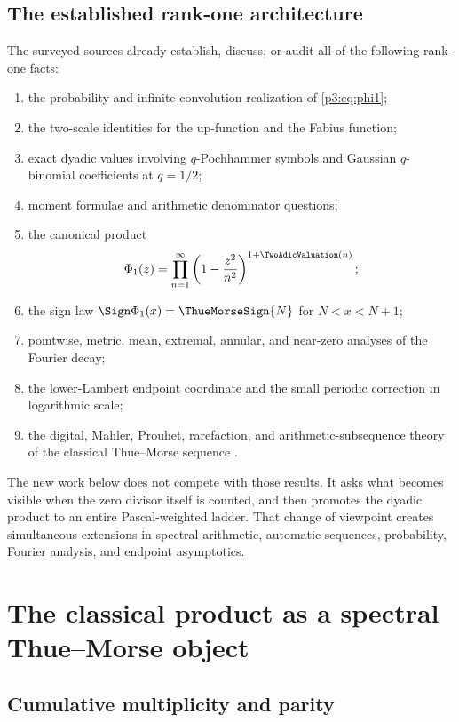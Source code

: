 \documentclass[11pt,oneside]{article}
\theoremstyle{definition}
\theoremstyle{remark}
\begin{document}
\subsection{The established rank-one architecture}

The surveyed sources \cite{p3:repo-primary,p3:repo-frontiers,p3:arias1982,p3:arias2018} already establish, discuss, or audit all of the following rank-one facts:
\begin{enumerate}[label=(\alph*)]
\item the probability and infinite-convolution realization of \eqref{p3:eq:phi1};
\item the two-scale identities for the up-function and the Fabius function;
\item exact dyadic values involving $q$-Pochhammer symbols and Gaussian $q$-binomial coefficients at $q=1/2$;
\item moment formulae and arithmetic denominator questions;
\item the canonical product
\[
  \Phi_1(z)=\prod_{n=1}^{\infty}\left(1-\frac{z^2}{n^2}\right)^{1+\TwoAdicValuation(n)};
\]
\item the sign law $\Sign\Phi_1(x)=\ThueMorseSign{N}$ for $N<x<N+1$;
\item pointwise, metric, mean, extremal, annular, and near-zero analyses of the Fourier decay;
\item the lower-Lambert endpoint coordinate and the small periodic correction in logarithmic scale;
\item the digital, Mahler, Prouhet, rarefaction, and arithmetic-subsequence theory of the classical Thue--Morse sequence \cite{p3:allouche-shallit-1999,p3:automatic-sequences,p3:toth2022}.
\end{enumerate}

The new work below does not compete with those results.  It asks what becomes visible when the zero divisor itself is counted, and then promotes the dyadic product to an entire Pascal-weighted ladder.  That change of viewpoint creates simultaneous extensions in spectral arithmetic, automatic sequences, probability, Fourier analysis, and endpoint asymptotics.

\section{The classical product as a spectral Thue--Morse object}\label{p3:sec:classical-spectral}

\subsection{Cumulative multiplicity and parity}
\end{document}
